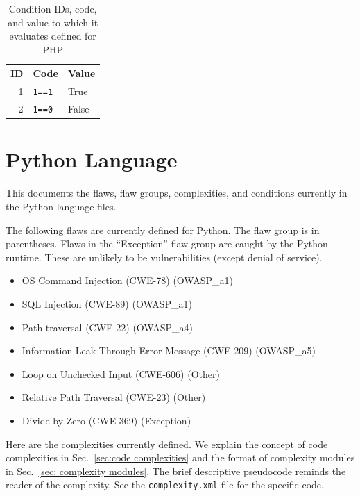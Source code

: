 \documentclass[12pt]{article}
\begin{document}
\begin{table}[H]
\centering
\caption{Condition IDs, code, and value to which it evaluates defined for
  PHP}
\begin{tabular}{|r|l|l|}
\hline
\textbf{ID} & \textbf{Code} & \textbf{Value} \\
\hline
1 & \verb|1==1| & True \\
\hline
2 & \verb|1==0| & False \\
\hline
\end{tabular}
\label{tab:condition IDs for PHP}
\end{table}


\section{Python Language}
\label{sec:Python language}

This documents the flaws, flaw groups, complexities, and conditions currently in the
Python language files.

The following flaws are currently defined for Python.  The flaw group is in
parentheses.  Flaws in the ``Exception'' flaw group are caught by the Python runtime.
These are unlikely to be vulnerabilities (except denial of service).
\begin{itemize}[nosep]
    \item OS Command Injection (CWE-78) (OWASP\_a1)
    \item SQL Injection (CWE-89) (OWASP\_a1)
    \item Path traversal (CWE-22) (OWASP\_a4)
    \item Information Leak Through Error Message (CWE-209) (OWASP\_a5)
    \item Loop on Unchecked Input (CWE-606) (Other)
    \item Relative Path Traversal (CWE-23) (Other)
    \item Divide by Zero (CWE-369) (Exception)
\end{itemize}

\newpage

Here are the complexities currently defined.
We explain the concept of code complexities in Sec.~\ref{sec:code complexities} and
the format of complexity modules in Sec.~\ref{sec: complexity modules}.
The brief descriptive pseudocode reminds the reader of the complexity.
See the \verb|complexity.xml| file for the specific code.
\end{document}
